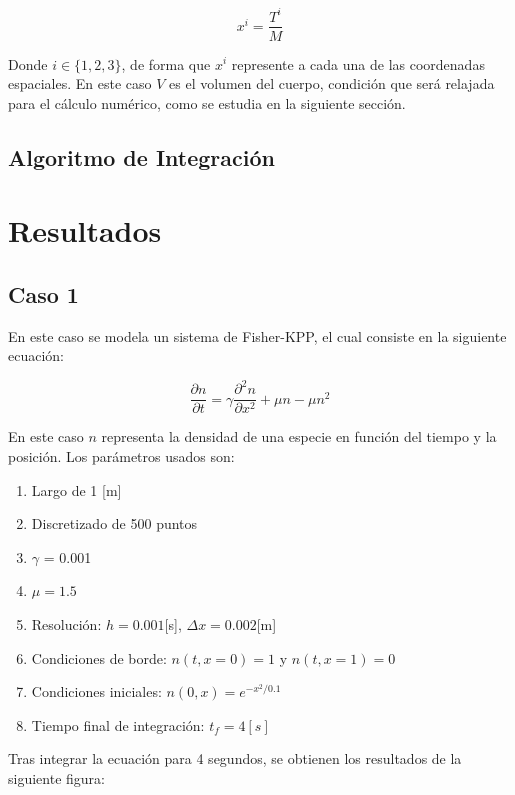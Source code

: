 \documentclass{article}
\begin{document}
\begin{equation}
  x^i = \frac{T^i}{M}
  \label{eq:calculo_coordenada}
\end{equation}

Donde $i \in \{1,2,3\}$, de forma que $x^i$ represente a cada una de las coordenadas espaciales. En este caso $V$ es el volumen del cuerpo, condición que será relajada para el cálculo numérico, como se estudia en la siguiente sección.

\subsection{Algoritmo de Integración}



\section{Resultados}

\subsection{Caso 1}

En este caso se modela un sistema de Fisher-KPP, el cual consiste en la siguiente ecuación:

\begin{equation}
  \frac{\partial n}{\partial t} = \gamma \frac{\partial^2n}{\partial x^2} + \mu n - \mu n^2
  \label{Fisher-KPP}
\end{equation}

En este caso $n$ representa la densidad de una especie en función del tiempo y la posición. Los parámetros usados son:

\begin{enumerate}
  \item Largo de 1 [m]
  \item Discretizado de 500 puntos
  \item $\gamma$ = 0.001
  \item $\mu  = 1.5$
  \item Resolución: $h = 0.001$[s], $\Delta x = 0.002$[m]
  \item Condiciones de borde: $n(t, x=0) = 1$ y $n(t, x=1) = 0$
  \item Condiciones iniciales: $ n(0, x) = e^{-x^2/0.1} $
  \item Tiempo final de integración: $t_f = 4[s]$
\end{enumerate}

Tras integrar la ecuación para 4 segundos, se obtienen los resultados de la siguiente figura:
\end{document}

